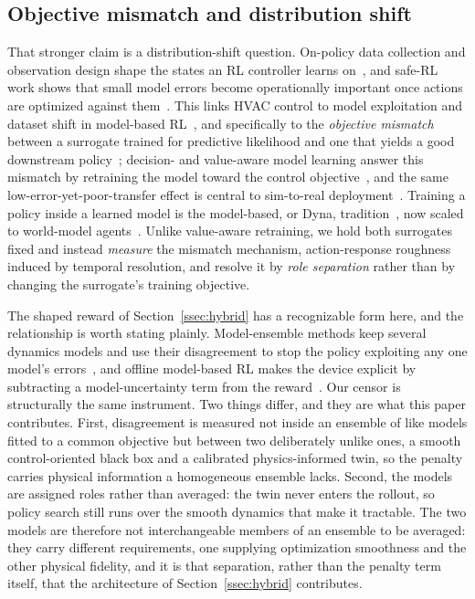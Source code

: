 \subsection{Objective mismatch and distribution shift}
That stronger claim is a distribution-shift question. On-policy data collection and observation
design shape the states an RL controller learns
on~\cite{Mayor2025Parallelized,Radac2025OnlineRL,Gao2024Predictive}, and safe-RL work shows that
small model errors become operationally important once actions are optimized against
them~\cite{Garcia2015SafeRL,Wang2025SafeDRL}. This links HVAC control to model exploitation and
dataset shift in model-based RL~\cite{Quinonero2009DatasetShift,RiahiSamani2026OOD}, and
specifically to the \emph{objective mismatch} between a surrogate trained for predictive likelihood
and one that yields a good downstream policy~\cite{Lambert2020ObjectiveMismatch,Janner2019MBPO};
decision- and value-aware model learning answer this mismatch by retraining the model toward the
control objective~\cite{Farahmand2017VAML}, and the same low-error-yet-poor-transfer effect is
central to sim-to-real deployment~\cite{Zhao2020Sim2Real}. Training a policy inside a learned model
is the model-based, or Dyna, tradition~\cite{Sutton1991Dyna}, now scaled to world-model
agents~\cite{Hafner2025Dreamer}. Unlike value-aware retraining, we hold both surrogates fixed and
instead \emph{measure} the mismatch mechanism, action-response roughness induced by temporal
resolution, and resolve it by \emph{role separation} rather than by changing the surrogate's
training objective.

The shaped reward of Section~\ref{ssec:hybrid} has a recognizable form here, and the relationship
is worth stating plainly. Model-ensemble methods keep several dynamics models and use their
disagreement to stop the policy exploiting any one model's errors~\cite{Kurutach2018METRPO}, and
offline model-based RL makes the device explicit by subtracting a model-uncertainty term from the
reward~\cite{Yu2020MOPO}. Our censor is structurally the same instrument. Two things differ, and
they are what this paper contributes. First, disagreement is measured not inside an ensemble of like
models fitted to a common objective but between two deliberately unlike ones, a smooth
control-oriented black box and a calibrated physics-informed twin, so the penalty carries physical
information a homogeneous ensemble lacks. Second, the models are assigned roles rather than
averaged: the twin never enters the rollout, so policy search still runs over the smooth dynamics
that make it tractable. The two models are therefore not interchangeable members of an ensemble to
be averaged: they carry different requirements, one supplying optimization smoothness and the other
physical fidelity, and it is that separation, rather than the penalty term itself, that the
architecture of Section~\ref{ssec:hybrid} contributes.

